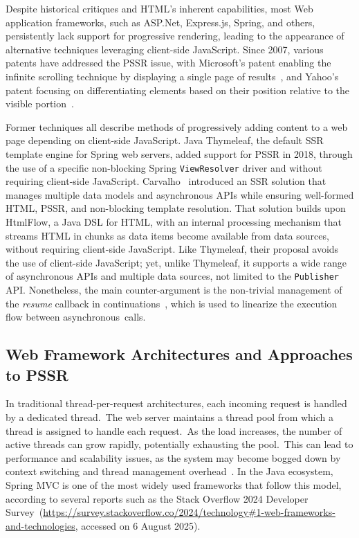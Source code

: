 \documentclass[software,article,accept,pdftex,moreauthors]{Definitions/mdpi}
\begin{document}
Despite historical critiques and HTML's inherent capabilities, most Web
application frameworks, such as ASP.Net, Express.js, Spring, and others,
persistently lack support for progressive rendering, leading to the appearance
of alternative techniques leveraging client-side JavaScript. Since 2007,
various patents have addressed the PSSR issue, with Microsoft's patent enabling
the infinite scrolling technique by displaying a single page of
results~\cite{scroll2007}, and Yahoo's patent focusing on differentiating
elements based on their position relative to the visible
portion~\cite{schiller2007progressive}.

Former techniques all describe methods of progressively adding content to a web
page depending on client-side JavaScript.
Java Thymeleaf, the default SSR template engine for Spring web servers,
added support for PSSR in 2018, through the use of a specific non-blocking
Spring \texttt{ViewResolver} driver and without requiring client-side
JavaScript.
Carvalho~\cite{carvalho2023async} introduced an SSR solution that manages
multiple data models and asynchronous APIs while ensuring well-formed HTML,
PSSR, and non-blocking template resolution. That solution builds upon HtmlFlow,
a Java DSL for HTML, with an internal processing mechanism that streams HTML in
chunks as data items become available from data sources, without requiring
client-side JavaScript. Like Thymeleaf, their proposal avoids the use of
client-side JavaScript; yet, unlike Thymeleaf, it supports a wide range of
asynchronous APIs and multiple data sources, not limited to the
\texttt{Publisher} API. Nonetheless, the main counter-argument is the non-trivial
management of the \emph{resume} callback in
continuations~\cite{von2003events,callbackhell}, which is used to linearize the
execution flow between asynchronous~calls.

\subsection{Web Framework Architectures and Approaches to PSSR}
\label{sec:web-frameworks}

In traditional thread-per-request architectures, each incoming request is
handled by a dedicated thread.~The web server maintains a thread pool from
which a thread is assigned to handle each request.~As the load increases, the
number of active threads can grow rapidly, potentially exhausting the pool.~This can lead to performance and scalability issues, as the system may become
bogged down by context switching and thread management
overhead~\cite{kant2000scalable}. In the Java ecosystem, Spring MVC is one of
the most widely used frameworks that follow this model, according to several
reports such as the Stack Overflow 2024 Developer
Survey~({\url{https://survey.stackoverflow.co/2024/technology\#1-web-frameworks-and-technologies}}, accessed on 6 August 2025).
\end{document}
